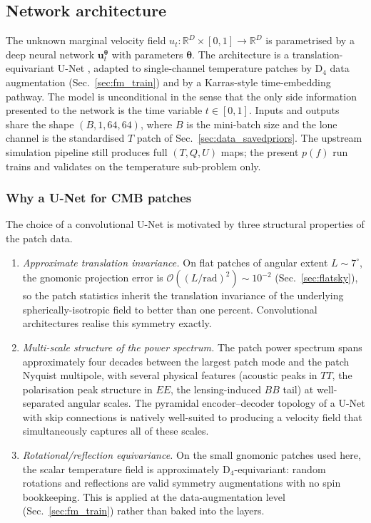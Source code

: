 \documentclass[11pt]{article}
\DeclareRobustCommand{\uvec}{\bm{u}}
\DeclareRobustCommand{\thetavec}{\bm{\theta}}
\newcommand{\Ndata}{\mathbb{R}^{D}}
\theoremstyle{definition}
\begin{document}
\subsection{Network architecture}
\label{sec:fm_arch}

The unknown marginal velocity field $u_t:\Ndata\!\times\![0,1]\to\Ndata$ is parametrised by a deep neural network $\uvec_t^{\thetavec}$ with parameters $\thetavec$. The architecture is a translation-equivariant U-Net \cite{ronneberger2015unet,ho2020ddpm}, adapted to single-channel temperature patches by $\mathrm{D}_4$ data augmentation (Sec.~\ref{sec:fm_train}) and by a Karras-style \cite{karras2022elucidating} time-embedding pathway. The model is unconditional in the sense that the only side information presented to the network is the time variable $t\in[0,1]$. Inputs and outputs share the shape $(B,1,64,64)$, where $B$ is the mini-batch size and the lone channel is the standardised $T$ patch of Sec.~\ref{sec:data_savedpriors}. The upstream simulation pipeline still produces full $(T,Q,U)$ maps; the present $p(f)$ run trains and validates on the temperature sub-problem only.

\subsubsection{Why a U-Net for CMB patches}

The choice of a convolutional U-Net is motivated by three structural properties of the patch data.
\begin{enumerate}[leftmargin=2.0em,itemsep=0.15em]
  \item \emph{Approximate translation invariance.} On flat patches of angular extent $L\sim 7^\circ$, the gnomonic projection error is $\mathcal O((L/\mathrm{rad})^2)\sim 10^{-2}$ (Sec.~\ref{sec:flatsky}), so the patch statistics inherit the translation invariance of the underlying spherically-isotropic field to better than one percent. Convolutional architectures realise this symmetry exactly.
  \item \emph{Multi-scale structure of the power spectrum.} The patch power spectrum spans approximately four decades between the largest patch mode and the patch Nyquist multipole, with several physical features (acoustic peaks in $TT$, the polarisation peak structure in $EE$, the lensing-induced $BB$ tail) at well-separated angular scales. The pyramidal encoder--decoder topology of a U-Net with skip connections is natively well-suited to producing a velocity field that simultaneously captures all of these scales.
  \item \emph{Rotational/reflection equivariance.} On the small gnomonic patches used here, the scalar temperature field is approximately $\mathrm{D}_4$-equivariant: random rotations and reflections are valid symmetry augmentations with no spin bookkeeping. This is applied at the data-augmentation level (Sec.~\ref{sec:fm_train}) rather than baked into the layers.
\end{enumerate}
\end{document}
